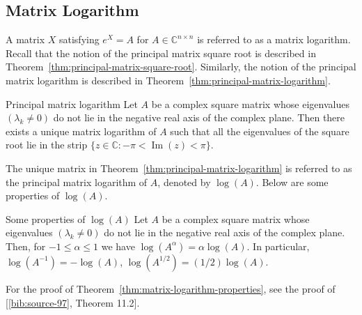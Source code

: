 \subsection{{Matrix Logarithm}}\label{sec:matrix-logarithm}

{A matrix $X$ satisfying $e^X=A$ for $A\in\mathbb{C}^{n\times n}$ is referred to as a matrix logarithm. Recall that the notion of the principal matrix square root is described in Theorem~\ref{thm:principal-matrix-square-root}. Similarly, the notion of the principal matrix logarithm is described in Theorem~\ref{thm:principal-matrix-logarithm}.}

\begin{Theorem}{{Principal matrix logarithm}}\label{thm:principal-matrix-logarithm}
{Let $A$ be a complex square matrix whose eigenvalues $(\lambda_k\ne0)$ do not lie in the negative real axis of the complex plane. Then there exists a unique matrix logarithm of $A$ such that all the eigenvalues of the square root lie in the strip $\{z\in\mathbb{C}:-\pi<\operatorname{Im}(z)<\pi\}$.}
\end{Theorem}

{The unique matrix in Theorem~\ref{thm:principal-matrix-logarithm} is referred to as the principal matrix logarithm of $A$, denoted by $\log(A)$. Below are some properties of $\log(A)$.}

\begin{Theorem}{{Some properties of $\log(A)$}}\label{thm:matrix-logarithm-properties}
{Let $A$ be a complex square matrix whose eigenvalues $(\lambda_k\ne0)$ do not lie in the negative real axis of the complex plane. Then, for $-1\le\alpha\le1$ we have $\log(A^\alpha)=\alpha\log(A)$. In particular, $\log(A^{-1})=-\log(A)$, $\log(A^{1/2})=(1/2)\log(A)$.}
\end{Theorem}

{For the proof of Theorem~\ref{thm:matrix-logarithm-properties}, see the proof of [\hyperref[bib:source-97]{\ref*{bib:source-97}}, Theorem 11.2].}

